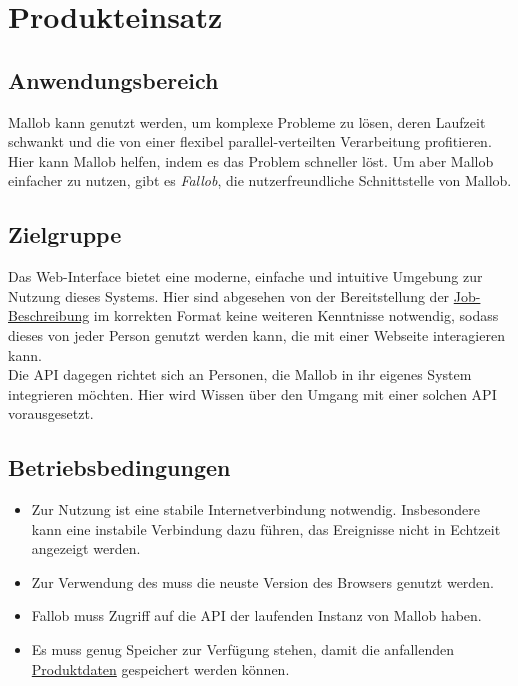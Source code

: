 \section{Produkteinsatz}

\subsection{Anwendungsbereich}

Mallob kann genutzt werden, um komplexe Probleme zu lösen, deren Laufzeit schwankt und die von einer flexibel parallel-verteilten Verarbeitung profitieren. Hier kann Mallob helfen, indem es das Problem schneller löst. Um aber Mallob einfacher zu nutzen, gibt es \textit{Fallob}, die nutzerfreundliche Schnittstelle von Mallob.

\subsection{Zielgruppe}

Das \gls{Web-Interface} bietet eine moderne, einfache und intuitive Umgebung zur Nutzung dieses Systems. Hier sind abgesehen von der Bereitstellung der \hyperref[B:Job-Beschreibung]{Job-Beschreibung} im korrekten Format keine weiteren Kenntnisse notwendig, sodass dieses von jeder Person genutzt werden kann, die mit einer Webseite interagieren  kann.\\
Die \gls{API} dagegen richtet sich an Personen, die Mallob in ihr eigenes System integrieren möchten. Hier wird Wissen über den Umgang mit einer solchen \gls{API} vorausgesetzt.

\subsection{Betriebsbedingungen}
\begin{itemize}
    \item Zur Nutzung ist eine stabile Internetverbindung notwendig. Insbesondere kann eine instabile Verbindung dazu führen, das Ereignisse nicht in Echtzeit angezeigt werden.
    \item Zur Verwendung des  muss die neuste Version des Browsers genutzt werden.
    \item Fallob muss Zugriff auf die \gls{API} der laufenden Instanz von Mallob haben.
    \item Es muss genug Speicher zur Verfügung stehen, damit die anfallenden \hyperref[PD]{Produktdaten} gespeichert werden können.
\end{itemize}